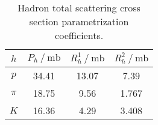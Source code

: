 \begin{table}[H]
	\centering
	\caption[Hadron total scattering cross section parametrization coefficients.]{Hadron total scattering cross section
			 parametrization coefficients. \cite{Belousov_2016}}
	\label{tab:hadron-scattering}
	\begin{tabular}{c S S S[table-format=1.3]}
		\midrule\midrule
		{$h$} & {$P_h \mathbin{/} \unit{\milli\barn}$} &
		{$R_h^1  \mathbin{/} \unit{\milli\barn}$} & {$R_h^2  \mathbin{/} \unit{\milli\barn}$} \\
		\midrule
		{$p$} & 34.41 & 13.07 & 7.39 \\
		{$\pi$} & 18.75 & 9.56 & 1.767 \\
		{$K$} & 16.36 & 4.29 & 3.408 \\
		\midrule\midrule
	\end{tabular}
\end{table}
